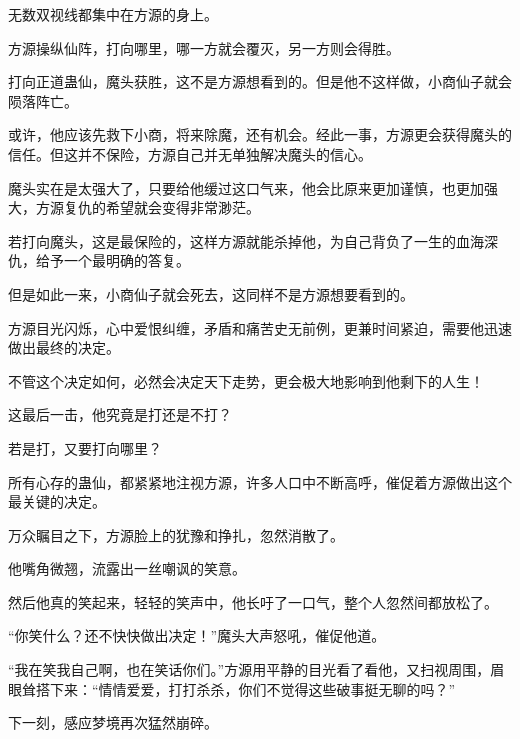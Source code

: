 \begin{this_body}
无数双视线都集中在方源的身上。

方源操纵仙阵，打向哪里，哪一方就会覆灭，另一方则会得胜。

打向正道蛊仙，魔头获胜，这不是方源想看到的。但是他不这样做，小商仙子就会陨落阵亡。

或许，他应该先救下小商，将来除魔，还有机会。经此一事，方源更会获得魔头的信任。但这并不保险，方源自己并无单独解决魔头的信心。

魔头实在是太强大了，只要给他缓过这口气来，他会比原来更加谨慎，也更加强大，方源复仇的希望就会变得非常渺茫。

若打向魔头，这是最保险的，这样方源就能杀掉他，为自己背负了一生的血海深仇，给予一个最明确的答复。

但是如此一来，小商仙子就会死去，这同样不是方源想要看到的。

方源目光闪烁，心中爱恨纠缠，矛盾和痛苦史无前例，更兼时间紧迫，需要他迅速做出最终的决定。

不管这个决定如何，必然会决定天下走势，更会极大地影响到他剩下的人生！

这最后一击，他究竟是打还是不打？

若是打，又要打向哪里？

所有心存的蛊仙，都紧紧地注视方源，许多人口中不断高呼，催促着方源做出这个最关键的决定。

万众瞩目之下，方源脸上的犹豫和挣扎，忽然消散了。

他嘴角微翘，流露出一丝嘲讽的笑意。

然后他真的笑起来，轻轻的笑声中，他长吁了一口气，整个人忽然间都放松了。

“你笑什么？还不快快做出决定！”魔头大声怒吼，催促他道。

“我在笑我自己啊，也在笑话你们。”方源用平静的目光看了看他，又扫视周围，眉眼耸搭下来：“情情爱爱，打打杀杀，你们不觉得这些破事挺无聊的吗？”

下一刻，感应梦境再次猛然崩碎。

\end{this_body}

